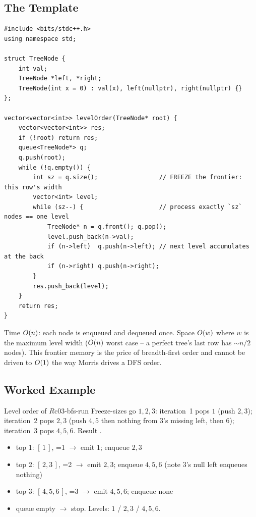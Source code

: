 \subsection{The Template}

\begin{lstlisting}[caption={Binary-tree level order -- the frontier-size snapshot}, label={lst:c03-bfs}]
#include <bits/stdc++.h>
using namespace std;

struct TreeNode {
    int val;
    TreeNode *left, *right;
    TreeNode(int x = 0) : val(x), left(nullptr), right(nullptr) {}
};

vector<vector<int>> levelOrder(TreeNode* root) {
    vector<vector<int>> res;
    if (!root) return res;
    queue<TreeNode*> q;
    q.push(root);
    while (!q.empty()) {
        int sz = q.size();                 // FREEZE the frontier: this row's width
        vector<int> level;
        while (sz--) {                     // process exactly `sz` nodes == one level
            TreeNode* n = q.front(); q.pop();
            level.push_back(n->val);
            if (n->left)  q.push(n->left); // next level accumulates at the back
            if (n->right) q.push(n->right);
        }
        res.push_back(level);
    }
    return res;
}
\end{lstlisting}
\begin{complexitybox}
Time $O(n)$: each node is enqueued and dequeued once. Space $O(w)$ where $w$ is the
maximum level width ($O(n)$ worst case -- a perfect tree's last row has $\sim n/2$
nodes). This frontier memory is the price of breadth-first order and cannot be driven to
$O(1)$ the way Morris drives a DFS order.
\end{complexitybox}

\subsection{Worked Example}

\begin{example}{Level order of $R$}{c03-bfs-run}
Freeze-sizes go $1,2,3$: iteration~1 pops $1$ (push $2,3$); iteration~2 pops $2,3$
(push $4,5$ then nothing from $3$'s missing left, then $6$); iteration~3 pops $4,5,6$.
Result \code{\{[1],[2,3],[4,5,6]\}}.
\end{example}
\begin{tracebox}
\begin{itemize}[nosep, leftmargin=1.4em]
  \item top 1: $[\,1\,]$, =1 $\to$ emit $1$; enqueue $2,3$
  \item top 2: $[\,2,3\,]$, =2 $\to$ emit $2,3$; enqueue $4,5,6$ (note $3$'s
        null left enqueues nothing)
  \item top 3: $[\,4,5,6\,]$, =3 $\to$ emit $4,5,6$; enqueue none
  \item queue empty $\to$ stop. Levels: $1$ / $2,3$ / $4,5,6$.
\end{itemize}
\end{tracebox}

